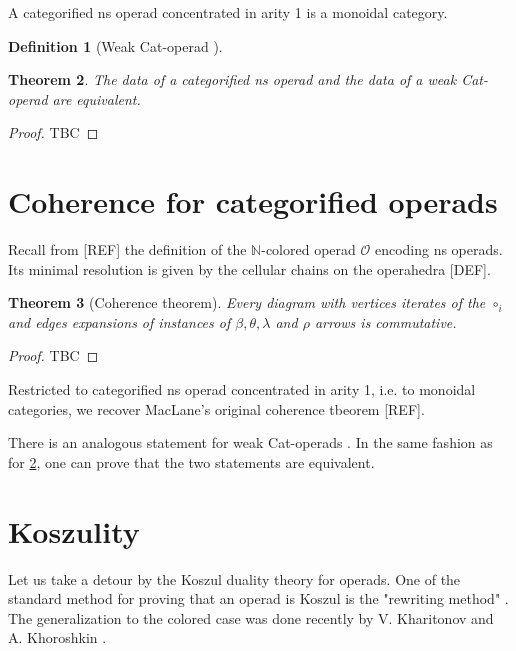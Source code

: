 \documentclass[10pt]{amsart}
\newtheorem{thm}{Theorem}[section]
\theoremstyle{definition}
\newtheorem{definition}[thm]{Definition}
\theoremstyle{remark}
\numberwithin{equation}{section}
\newcommand{\0}{\color{blue}{\mathsf{0}}}
\begin{document}
A categorified ns operad concentrated in arity 1 is a monoidal category.

\begin{definition}[Weak Cat-operad {\cite{DP15}}]
\end{definition}

\begin{thm} \label{thm:equivalenceDPGLA}
    The data of a categorified ns operad and the data of a weak Cat-operad are equivalent.  
\end{thm}

\begin{proof}
    TBC
\end{proof}

\section{Coherence for categorified operads}

Recall from [REF] the definition of the $\mathbb{N}$-colored operad $\mathcal{O}$ encoding ns operads. Its minimal resolution is given by the cellular chains on the operahedra [DEF]. 



\begin{thm}[Coherence theorem] \label{thm:coherence}
    Every diagram with vertices iterates of the $\circ_i$ and edges expansions of instances of $\beta, \theta, \lambda$ and $\rho$ arrows is commutative. 
\end{thm}

\begin{proof} TBC
\end{proof}

Restricted to categorified ns operad concentrated in arity 1, i.e. to monoidal categories, we recover MacLane's original coherence tbeorem [REF].

There is an analogous statement for weak Cat-operads \cite[Proposition 14.2]{DP15}. In the same fashion as for \cref{thm:equivalenceDPGLA}, one can prove that the two statements are equivalent. 

\section{Koszulity}

Let us take a detour by the Koszul duality theory for operads. One of the standard method for proving that an operad is Koszul is the "rewriting method" \cite[Section 8.3]{LodayVallette12}. The generalization to the colored case was done recently by V. Kharitonov and A. Khoroshkin \cite[Theorem 3.12]{KhariKhoro20}.
\end{document}
